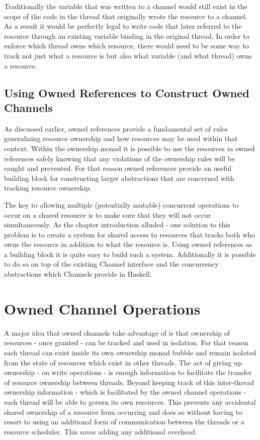 \documentclass[onehalf,11pt]{beavtex}
\begin{document}
Traditionally the variable that was written to a channel would still exist in the
scope of the code in the thread that originally wrote the resource to a channel.
As a result it would be perfectly legal to write code that later referred to the
resource through an existing variable binding in the original thread.
In order to enforce which thread owns which resource, there would need to be
some way to track not just what a resource is but also what variable (and what
thread) owns a resource.

\subsection{Using Owned References to Construct Owned Channels}

As discussed earlier, owned references provide a fundamental set of
rules generalizing resource ownership and how resources may be used within that
context.  Within the ownership monad it is possible to use the
resources in owned references safely knowing that any violations of
the ownership rules will be caught and prevented.  For that reason
owned references provide an useful building block for constructing
larger abstractions that are concerned with tracking resource ownership.

The key to allowing multiple (potentially mutable) concurrent operations to occur
on a shared resource is to make sure that they will not occur simultaneously.
As the chapter introduction alluded - one solution to this problem is to
create a system for shared access to resources that tracks both who owns the
resource in addition to what the resource is.
Using owned references as a building block it is quite easy to build
such a system. Additionally it is possible to do so on top of the existing
Channel interface and the concurrency abstractions which Channels provide in
Haskell.


\section{Owned Channel Operations}

A major idea that owned channels take advantage of is that ownership
of resources - once granted - can be tracked and used in isolation. For that reason
each thread can exist inside its own ownership monad bubble and
remain isolated from the state of resources which exist in other threads.
The act of giving up ownership - on write operations - is enough information to
facilitate the transfer of resource ownership between threads.
Beyond keeping track of this inter-thread ownership information - which is
facilitated by the owned channel operations - each thread will be able
to govern its own resources.  This prevents any accidental shared ownership of
a resource from occurring and does so without having to resort to using an
additional form of communication between the threads or a resource scheduler.
This saves adding any additional overhead.
\end{document}

